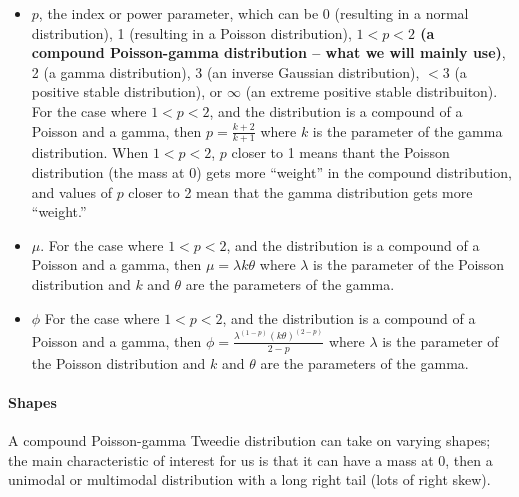 \documentclass[]{book}
\providecommand{\tightlist}{%
  \setlength{\itemsep}{0pt}\setlength{\parskip}{0pt}}
\let\oldparagraph\paragraph
\renewcommand{\paragraph}[1]{\oldparagraph{#1}\mbox{}}
\begin{document}
\begin{itemize}
\tightlist
\item
  \(p\), the index or power parameter, which can be 0 (resulting in a normal distribution), 1 (resulting in a Poisson distribution), \textbf{\(1 < p < 2\) (a compound Poisson-gamma distribution -- what we will mainly use)}, 2 (a gamma distribution), 3 (an inverse Gaussian distribution), \(<3\) (a positive stable distribution), or \(\infty\) (an extreme positive stable distribuiton). For the case where \(1 < p < 2\), and the distribution is a compound of a Poisson and a gamma, then \(p = \frac{k+2}{k+1}\) where \(k\) is the parameter of the gamma distribution. When \(1<p<2\), \(p\) closer to 1 means thant the Poisson distribution (the mass at 0) gets more ``weight'' in the compound distribution, and values of \(p\) closer to 2 mean that the gamma distribution gets more ``weight.''
\item
  \(\mu\). For the case where \(1 < p < 2\), and the distribution is a compound of a Poisson and a gamma, then \(\mu = \lambda k \theta\) where \(\lambda\) is the parameter of the Poisson distribution and \(k\) and \(\theta\) are the parameters of the gamma.
\item
  \(\phi\) For the case where \(1 < p < 2\), and the distribution is a compound of a Poisson and a gamma, then \(\phi = \frac{\lambda^{(1-p)} (k \theta) ^{(2-p)}}{2-p}\) where \(\lambda\) is the parameter of the Poisson distribution and \(k\) and \(\theta\) are the parameters of the gamma.
\end{itemize}

\hypertarget{shapes-6}{%
\paragraph{Shapes}\label{shapes-6}}

A compound Poisson-gamma Tweedie distribution can take on varying shapes; the main characteristic of interest for us is that it can have a mass at 0, then a unimodal or multimodal distribution with a long right tail (lots of right skew).
\end{document}
